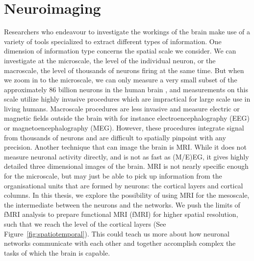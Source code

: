 \section*{Neuroimaging}
Researchers who endeavour to investigate the workings of the brain make use of a variety of tools specialized to extract different types of information. One dimension of information type concerns the spatial scale we consider. We can investigate at the microscale, the level of the individual neuron, or the macroscale, the level of thousands of neurons firing at the same time. But when we zoom in to the microscale, we can only measure a very small subset of the approximately 86 billion neurons in the human brain \cite{Herculano-Houzel2009}, and measurements on this scale utilize highly invasive procedures which are impractical for large scale use in living humans. Macroscale procedures are less invasive and measure electric or magnetic fields outside the brain with for instance electroencephalography (EEG) or magnetoencephalography (MEG). However, these procedures integrate signal from thousands of neurons and are difficult to spatially pinpoint with any precision. Another technique that can image the brain is MRI. While it does not measure neuronal activity directly, and is not as fast as (M/E)EG, it gives highly detailed three dimensional images of the brain. MRI is not nearly specific enough for the microscale, but may just be able to pick up information from the organisational units that are formed by neurons: the cortical layers and cortical columns. In this thesis, we explore the possibility of using MRI for the mesoscale, the intermediate between the neurons and the networks. We push the limits of fMRI analysis to prepare functional MRI (fMRI) for higher spatial resolution, such that we reach the level of the cortical layers (See Figure~\ref{fig:spatiotemporal}). This could teach us more about how neuronal networks communicate with each other and together accomplish complex the tasks of which the brain is capable.


